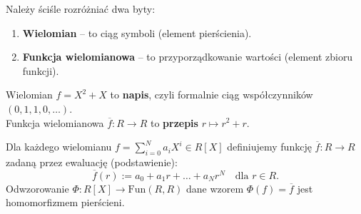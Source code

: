 Należy ściśle rozróżniać dwa byty:
\begin{enumerate}
    \item \textbf{Wielomian} – to ciąg symboli (element pierścienia).
    \item \textbf{Funkcja wielomianowa} – to przyporządkowanie wartości (element zbioru funkcji).
\end{enumerate}

\begin{intuition}
    Wielomian $f = X^2 + X$ to \textbf{napis}, czyli formalnie ciąg współczynników $(0, 1, 1, 0, \dots)$.\\
    Funkcja wielomianowa $\overline{f}: R \to R$ to \textbf{przepis} $r \mapsto r^2 + r$.
\end{intuition}

\begin{definition}
    Dla każdego wielomianu $f = \sum_{i=0}^N a_i X^i \in R[X]$ definiujemy funkcję $\overline{f}: R \to R$ zadaną przez ewaluację (podstawienie):
    \[ 
        \overline{f}(r) := a_0 + a_1r + \dots + a_N r^N \quad \text{dla } r \in R.
    \]
    Odwzorowanie $\Phi: R[X] \to \text{Fun}(R,R)$ dane wzorem $\Phi(f) = \overline{f}$ jest homomorfizmem pierścieni.
\end{definition}

